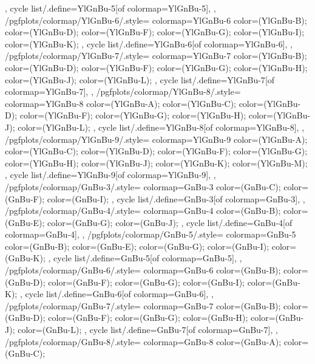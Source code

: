 {{{    },
    cycle list/.define={YlGnBu-5}{[of colormap=YlGnBu-5]},
  },
  /pgfplots/colormap/YlGnBu-6/.style={
    colormap={YlGnBu-6}{
      color=(YlGnBu-B);
      color=(YlGnBu-D);
      color=(YlGnBu-F);
      color=(YlGnBu-G);
      color=(YlGnBu-I);
      color=(YlGnBu-K);
    },
    cycle list/.define={YlGnBu-6}{[of colormap=YlGnBu-6]},
  },
  /pgfplots/colormap/YlGnBu-7/.style={
    colormap={YlGnBu-7}{
      color=(YlGnBu-B);
      color=(YlGnBu-D);
      color=(YlGnBu-F);
      color=(YlGnBu-G);
      color=(YlGnBu-H);
      color=(YlGnBu-J);
      color=(YlGnBu-L);
    },
    cycle list/.define={YlGnBu-7}{[of colormap=YlGnBu-7]},
  },
  /pgfplots/colormap/YlGnBu-8/.style={
    colormap={YlGnBu-8}{
      color=(YlGnBu-A);
      color=(YlGnBu-C);
      color=(YlGnBu-D);
      color=(YlGnBu-F);
      color=(YlGnBu-G);
      color=(YlGnBu-H);
      color=(YlGnBu-J);
      color=(YlGnBu-L);
    },
    cycle list/.define={YlGnBu-8}{[of colormap=YlGnBu-8]},
  },
  /pgfplots/colormap/YlGnBu-9/.style={
    colormap={YlGnBu-9}{
      color=(YlGnBu-A);
      color=(YlGnBu-C);
      color=(YlGnBu-D);
      color=(YlGnBu-F);
      color=(YlGnBu-G);
      color=(YlGnBu-H);
      color=(YlGnBu-J);
      color=(YlGnBu-K);
      color=(YlGnBu-M);
    },
    cycle list/.define={YlGnBu-9}{[of colormap=YlGnBu-9]},
  },
  /pgfplots/colormap/GnBu-3/.style={
    colormap={GnBu-3}{
      color=(GnBu-C);
      color=(GnBu-F);
      color=(GnBu-I);
    },
    cycle list/.define={GnBu-3}{[of colormap=GnBu-3]},
  },
  /pgfplots/colormap/GnBu-4/.style={
    colormap={GnBu-4}{
      color=(GnBu-B);
      color=(GnBu-E);
      color=(GnBu-G);
      color=(GnBu-J);
    },
    cycle list/.define={GnBu-4}{[of colormap=GnBu-4]},
  },
  /pgfplots/colormap/GnBu-5/.style={
    colormap={GnBu-5}{
      color=(GnBu-B);
      color=(GnBu-E);
      color=(GnBu-G);
      color=(GnBu-I);
      color=(GnBu-K);
    },
    cycle list/.define={GnBu-5}{[of colormap=GnBu-5]},
  },
  /pgfplots/colormap/GnBu-6/.style={
    colormap={GnBu-6}{
      color=(GnBu-B);
      color=(GnBu-D);
      color=(GnBu-F);
      color=(GnBu-G);
      color=(GnBu-I);
      color=(GnBu-K);
    },
    cycle list/.define={GnBu-6}{[of colormap=GnBu-6]},
  },
  /pgfplots/colormap/GnBu-7/.style={
    colormap={GnBu-7}{
      color=(GnBu-B);
      color=(GnBu-D);
      color=(GnBu-F);
      color=(GnBu-G);
      color=(GnBu-H);
      color=(GnBu-J);
      color=(GnBu-L);
    },
    cycle list/.define={GnBu-7}{[of colormap=GnBu-7]},
  },
  /pgfplots/colormap/GnBu-8/.style={
    colormap={GnBu-8}{
      color=(GnBu-A);
      color=(GnBu-C);
}}}
